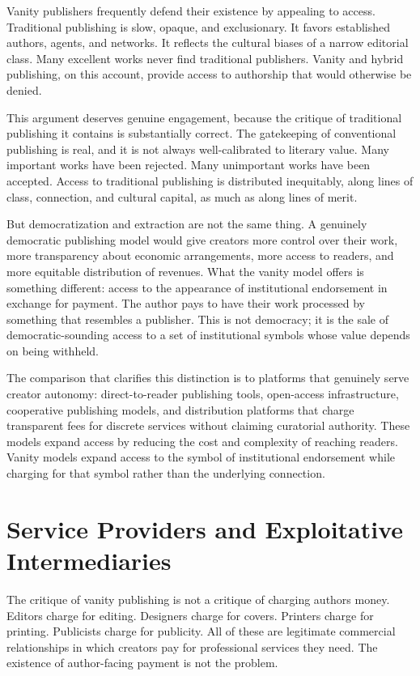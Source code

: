 \documentclass[12pt, a4paper]{article}
\begin{document}
Vanity publishers frequently defend their existence by appealing to access. Traditional publishing is slow, opaque, and exclusionary. It favors established authors, agents, and networks. It reflects the cultural biases of a narrow editorial class. Many excellent works never find traditional publishers. Vanity and hybrid publishing, on this account, provide access to authorship that would otherwise be denied.

This argument deserves genuine engagement, because the critique of traditional publishing it contains is substantially correct. The gatekeeping of conventional publishing is real, and it is not always well-calibrated to literary value. Many important works have been rejected. Many unimportant works have been accepted. Access to traditional publishing is distributed inequitably, along lines of class, connection, and cultural capital, as much as along lines of merit.

But democratization and extraction are not the same thing. A genuinely democratic publishing model would give creators more control over their work, more transparency about economic arrangements, more access to readers, and more equitable distribution of revenues. What the vanity model offers is something different: access to the appearance of institutional endorsement in exchange for payment. The author pays to have their work processed by something that resembles a publisher. This is not democracy; it is the sale of democratic-sounding access to a set of institutional symbols whose value depends on being withheld.

The comparison that clarifies this distinction is to platforms that genuinely serve creator autonomy: direct-to-reader publishing tools, open-access infrastructure, cooperative publishing models, and distribution platforms that charge transparent fees for discrete services without claiming curatorial authority. These models expand access by reducing the cost and complexity of reaching readers. Vanity models expand access to the symbol of institutional endorsement while charging for that symbol rather than the underlying connection.

\section{Service Providers and Exploitative Intermediaries}

The critique of vanity publishing is not a critique of charging authors money. Editors charge for editing. Designers charge for covers. Printers charge for printing. Publicists charge for publicity. All of these are legitimate commercial relationships in which creators pay for professional services they need. The existence of author-facing payment is not the problem.
\end{document}

